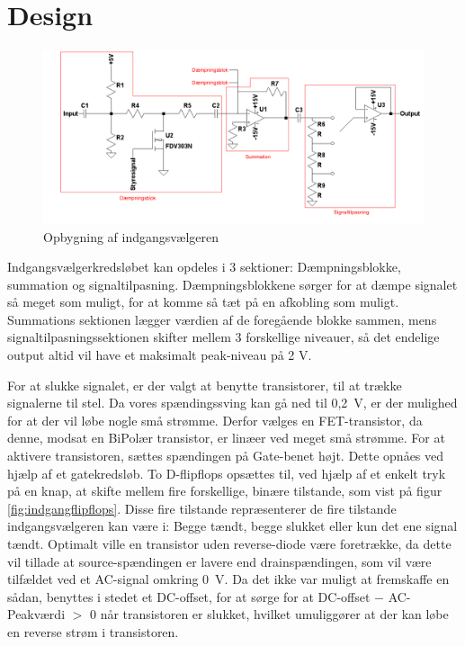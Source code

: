 \section{Design}

\begin{figure}[h]
\centering
\includegraphics[width=\textwidth]{teknisk/indgangsvaelger/signal-taend-sluk.png}
\caption{Opbygning af indgangsvælgeren}
\label{indgangsvaelger-overordnet}
\end{figure}
Indgangsvælgerkredsløbet kan opdeles i 3 sektioner: Dæmpningsblokke, summation og	 signaltilpasning. Dæmpningsblokkene sørger for at dæmpe signalet så meget som muligt, for at komme så tæt på en afkobling som muligt. Summations sektionen lægger værdien af de foregående blokke sammen, mens signaltilpasningssektionen skifter mellem 3 forskellige niveauer, så det endelige output altid vil have et maksimalt peak-niveau på 2 V.  

For at slukke signalet, er der valgt at benytte transistorer, til at trække signalerne til stel. Da vores spændingssving kan gå ned til 0,2~V, er der mulighed for at der vil løbe nogle små strømme. Derfor vælges en FET-transistor, da denne, modsat en BiPolær transistor, er linæer ved meget små strømme. For at aktivere transistoren, sættes spændingen på Gate-benet højt. Dette opnåes ved hjælp af et gatekredsløb. To D-flipflops opsættes til, ved hjælp af et enkelt tryk på en knap, at skifte mellem fire forskellige, binære tilstande, som vist på figur \ref{fig:indgangflipflops}. Disse fire tilstande repræsenterer de fire tilstande indgangsvælgeren kan være i: Begge tændt, begge slukket eller kun det ene signal tændt.
Optimalt ville en transistor uden reverse-diode være foretrække, da dette vil tillade at source-spændingen er lavere end drainspændingen, som vil være tilfældet ved et AC-signal omkring 0~V. Da det ikke var muligt at fremskaffe en sådan, benyttes i stedet et DC-offset, for at sørge for at DC-offset $-$ AC-Peakværdi $>$ 0 når transistoren er slukket, hvilket umuliggører at der kan løbe en reverse strøm i transistoren.

